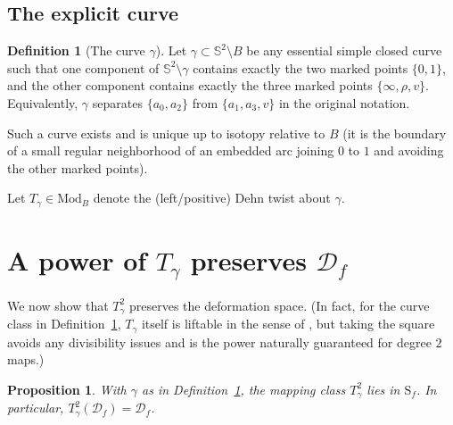 \documentclass[11pt]{article}
\newtheorem{proposition}[theorem]{Proposition}
\theoremstyle{definition}
\newtheorem{definition}[theorem]{Definition}
\newcommand{\Sph}{\mathbb{S}^2}
\newcommand{\Def}{\mathcal{D}}
\newcommand{\Mod}{\mathrm{Mod}}
\begin{document}
\subsection*{The explicit curve}

\begin{definition}[The curve $\gamma$]
\label{def:gamma}
Let $\gamma\subset \Sph\setminus B$ be any essential simple closed curve such that one component of $\Sph\setminus \gamma$ contains exactly the two marked points $\{0,1\}$, and the other component contains exactly the three marked points $\{\infty,\rho,v\}$. Equivalently, $\gamma$ separates $\{a_0,a_2\}$ from $\{a_1,a_3,v\}$ in the original notation.
\end{definition}

Such a curve exists and is unique up to isotopy relative to $B$ (it is the boundary of a small regular neighborhood of an embedded arc joining $0$ to $1$ and avoiding the other marked points).

Let $T_\gamma\in \Mod_B$ denote the (left/positive) Dehn twist about $\gamma$.

\section{A power of \texorpdfstring{$T_\gamma$}{Tgamma} preserves \texorpdfstring{$\Def_f$}{Df}}

We now show that $T_\gamma^2$ preserves the deformation space. (In fact, for the curve class in Definition~\ref{def:gamma}, $T_\gamma$ itself is liftable in the sense of \cite{FKS}, but taking the square avoids any divisibility issues and is the power naturally guaranteed for degree $2$ maps.)

\begin{proposition}
\label{prop:twistpreserves}
With $\gamma$ as in Definition~\ref{def:gamma}, the mapping class $T_\gamma^2$ lies in $\mathrm{S}_f$. In particular, $T_\gamma^2(\Def_f)=\Def_f$.
\end{proposition}
\end{document}
